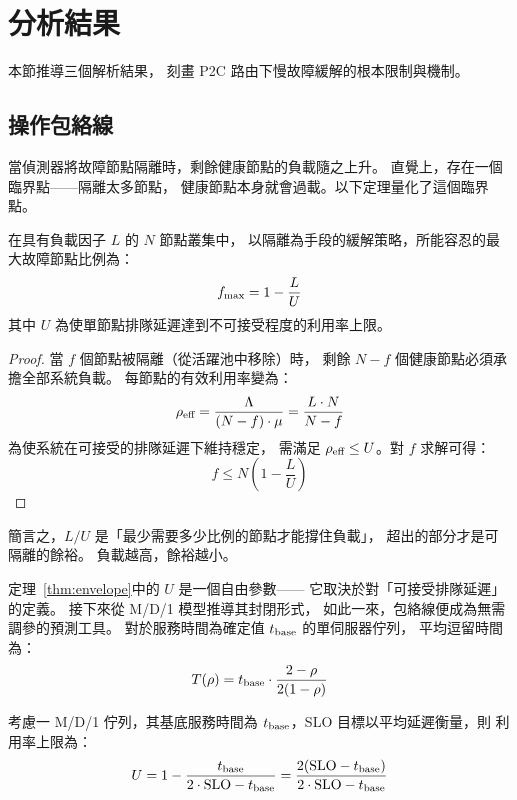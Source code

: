 \section{分析結果}
\label{sec:analysis}

本節推導三個解析結果，
刻畫 P2C 路由下慢故障緩解的根本限制與機制。

\subsection{操作包絡線}
\label{sec:envelope}

當偵測器將故障節點隔離時，剩餘健康節點的負載隨之上升。
直覺上，存在一個臨界點——隔離太多節點，
健康節點本身就會過載。以下定理量化了這個臨界點。

\begin{theorem}[操作包絡線]
\label{thm:envelope}
在具有負載因子 $L$ 的 $N$ 節點叢集中，
以隔離為手段的緩解策略，所能容忍的最大故障節點比例為：
\begin{equation}
  f_{\max} = 1 - \frac{L}{U}
\end{equation}
其中 $U$ 為使單節點排隊延遲達到不可接受程度的利用率上限。
\end{theorem}

\begin{proof}
當 $f$ 個節點被隔離（從活躍池中移除）時，
剩餘 $N - f$ 個健康節點必須承擔全部系統負載。
每節點的有效利用率變為：
\begin{equation}
  \rho_{\text{eff}} = \frac{\Lambda}{(N-f) \cdot \mu} = \frac{L \cdot N}{N - f}
\end{equation}
為使系統在可接受的排隊延遲下維持穩定，
需滿足 $\rho_{\text{eff}} \leq U$。對 $f$ 求解可得：
\begin{equation}
  f \leq N \left(1 - \frac{L}{U}\right)
\end{equation}
\end{proof}

簡言之，$L/U$ 是「最少需要多少比例的節點才能撐住負載」，
超出的部分才是可隔離的餘裕。
負載越高，餘裕越小。

\medskip

定理~\ref{thm:envelope}中的 $U$ 是一個自由參數——
它取決於對「可接受排隊延遲」的定義。
接下來從 M/D/1 模型推導其封閉形式，
如此一來，包絡線便成為無需調參的預測工具。
對於服務時間為確定值 $t_{\text{base}}$ 的單伺服器佇列，
平均逗留時間為：
\begin{equation}
  T(\rho) = t_{\text{base}} \cdot \frac{2 - \rho}{2(1 - \rho)}
  \label{eq:md1}
\end{equation}

\begin{corollary}[封閉式利用率上限]
\label{cor:U}
考慮一 M/D/1 佇列，其基底服務時間為 $t_{\text{base}}$，SLO 目標以平均延遲衡量，則
利用率上限為：
\begin{equation}
  U = 1 - \frac{t_{\text{base}}}{2 \cdot \text{SLO} - t_{\text{base}}}
    = \frac{2(\text{SLO} - t_{\text{base}})}{2 \cdot \text{SLO} - t_{\text{base}}}
  \label{eq:U}
\end{equation}
\end{corollary}

